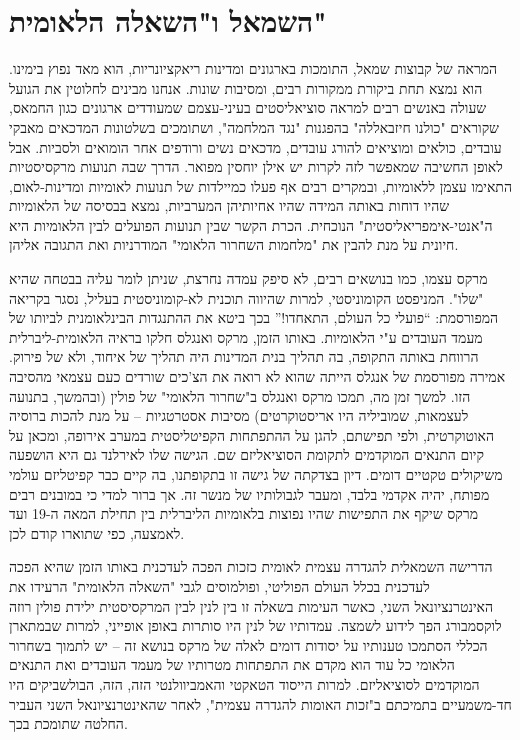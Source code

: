 \section{השמאל ו"השאלה הלאומית"}

המראה של קבוצות שמאל, התומכות בארגונים ומדינות ריאקציונריות, הוא מאד נפוץ בימינו. הוא נמצא תחת ביקורת ממקורות רבים, ומסיבות שונות. אנחנו מבינים לחלוטין את הגועל שעולה באנשים רבים למראה סוציאליסטים בעיני-עצמם שמעודדים ארגונים כגון החמאס, שקוראים "כולנו חיזבאללה" בהפגנות "נגד המלחמה", ושתומכים בשלטונות המדכאים מאבקי עובדים, כולאים ומוציאים להורג עובדים, מדכאים נשים ורודפים אחר הומואים ולסביות. אבל לאופן החשיבה שמאפשר לזה לקרות יש אילן יוחסין מפואר. הדרך שבה תנועות מרקסיסטיות התאימו עצמן ללאומיות, ובמקרים רבים אף פעלו כמיילדות של תנועות לאומיות ומדינות-לאום, שהיו דוחות באותה המידה שהיו אחיותיהן המערביות, נמצא בבסיסה של הלאומיות ה"אנטי-אימפריאליסטית" הנוכחית. הכרת הקשר שבין תנועות הפועלים לבין הלאומיות היא חיונית על מנת להבין את "מלחמות השחרור הלאומי" המודרניות ואת התגובה אליהן.

מרקס עצמו, כמו בנושאים רבים, לא סיפק עמדה נחרצת, שניתן לומר עליה בבטחה שהיא "שלו". המניפסט הקומוניסטי, למרות שהיווה תוכנית לא-קומוניסטית בעליל, נסגר בקריאה המפורסמת: “פועלי כל העולם, התאחדו!” בכך ביטא את ההתנגדות הבינלאומנית לביותו של מעמד העובדים ע"י הלאומיות. באותו הזמן, מרקס ואנגלס חלקו בראיה הלאומית-ליברלית הרווחת באותה התקופה, בה תהליך בנית המדינות היה תהליך של איחוד, ולא של פירוק. אמירה מפורסמת של אנגלס הייתה שהוא לא רואה את הצ'כים שורדים כעם עצמאי מהסיבה הזו. למשך זמן מה, תמכו מרקס ואנגלס ב"שחרור הלאומי" של פולין (ובהמשך, בתנועה לעצמאות, שמוביליה היו אריסטוקרטים) מסיבות אסטרטגיות – על מנת להכות ברוסיה האוטוקרטית, ולפי תפישתם, להגן על ההתפתחות הקפיטליסטית במערב אירופה, ומכאן על קיום התנאים המוקדמים לתקומת הסוציאליזם שם. הגישה שלו לאירלנד גם היא הושפעה משיקולים טקטיים דומים. דיון בצדקתה של גישה זו בתקופתנו, בה קיים כבר קפיטליזם עולמי מפותח, יהיה אקדמי בלבד, ומעבר לגבולותיו של מנשר זה. אך ברור למדי כי במובנים רבים מרקס שיקף את התפישות שהיו נפוצות בלאומיות הליברלית בין תחילת המאה ה-19 ועד לאמצעה, כפי שתוארו קודם לכן.

הדרישה השמאלית להגדרה עצמית לאומית כזכות הפכה לעדכנית באותו הזמן שהיא הפכה לעדכנית בכלל העולם הפוליטי, ופולמוסים לגבי "השאלה הלאומית" הרעידו את האינטרנציונאל השני, כאשר העימות בשאלה זו בין לנין לבין המרקסיסטית ילידת פולין רוזה לוקסמבורג הפך לידוע לשמצה. עמדותיו של לנין היו סותרות באופן אופייני, למרות שבמתארן הכללי הסתמכו טענותיו על יסודות דומים לאלה של מרקס בנושא זה – יש לתמוך בשחרור הלאומי כל עוד הוא מקדם את התפתחות מטרותיו של מעמד העובדים ואת התנאים המוקדמים לסוציאליזם. למרות הייסוד הטאקטי והאמביוולנטי הזה, הזה, הבולשביקים היו חד-משמעיים בתמיכתם ב"זכות האומות להגדרה עצמית", לאחר שהאינטרנציונאל השני העביר החלטה שתומכת בכך.


